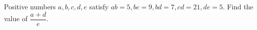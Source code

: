Positive numbers $a, b, c, d, e$ satisfy $ab=5, bc=9, bd=7, cd=21, de=5$. Find the value of $\dfrac{a+d}{e}$.

